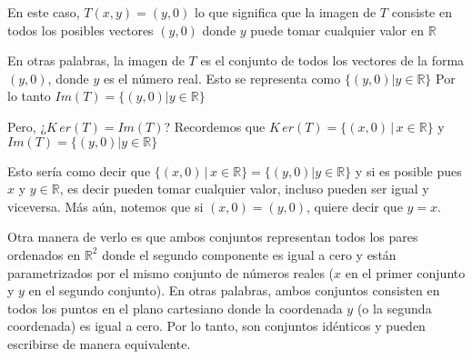 \begin{enumerate}
    En este caso, $T(x,y) = (y,0)$ lo que significa que la imagen 
    de $T$ consiste en todos los posibles vectores $(y,0)$ donde 
    $y$ puede tomar cualquier valor en $\mathbb{R}$

    En otras palabras, la imagen de $T$ es el conjunto de todos 
    los vectores de la forma $(y,0)$, donde $y$ es el número real. 
    Esto se representa como $\{ (y,0) | y \in \mathbb{R} \}$
    Por lo tanto $Im(T) = \{ (y,0) | y \in \mathbb{R} \}$

    Pero, ¿$K\,er(T) = Im(T)$? 
    Recordemos que $K\,er(T) = \{(x, 0) \, | \, x \in \mathbb{R}\}$ y $Im(T) = \{ (y,0) | y \in \mathbb{R} \}$
    
    
    Esto sería como decir que 
    $\{(x, 0) \, | \, x \in \mathbb{R}\} = \{ (y,0) | y \in \mathbb{R} \}$ 
    y si es posible pues $x$ y $y \in \mathbb{R}$, es decir  
    pueden tomar cualquier valor, incluso pueden ser igual
    y viceversa. Más aún, notemos que si $(x, 0) = (y, 0)$, quiere decir que $y = x$.

    Otra manera de verlo es que ambos conjuntos representan todos los pares ordenados en $\mathbb{R}^2$ donde el segundo componente es igual a cero y están parametrizados por el mismo conjunto de números reales ($x$ en el primer conjunto y $y$ en el segundo conjunto). En otras palabras, ambos conjuntos consisten en todos los puntos en el plano cartesiano donde la coordenada $y$ (o la segunda coordenada) es igual a cero. Por lo tanto, son conjuntos idénticos y pueden escribirse de manera equivalente.





\end{enumerate}
